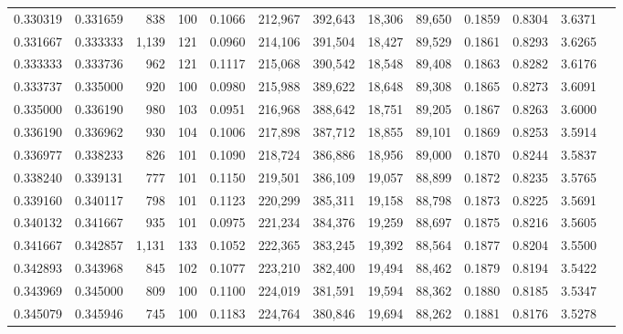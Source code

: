 \begin{tabular}{rrrrrrrrrrrrr}
0.330319 & 0.331659 &    838 &   100 &                                     0.1066 & 212,967 & 392,643 &  18,306 &  89,650 & 0.1859 & 0.8304 & 3.6371 \\
0.331667 & 0.333333 &  1,139 &   121 &                                     0.0960 & 214,106 & 391,504 &  18,427 &  89,529 & 0.1861 & 0.8293 & 3.6265 \\
0.333333 & 0.333736 &    962 &   121 &                                     0.1117 & 215,068 & 390,542 &  18,548 &  89,408 & 0.1863 & 0.8282 & 3.6176 \\
0.333737 & 0.335000 &    920 &   100 &                                     0.0980 & 215,988 & 389,622 &  18,648 &  89,308 & 0.1865 & 0.8273 & 3.6091 \\
0.335000 & 0.336190 &    980 &   103 &                                     0.0951 & 216,968 & 388,642 &  18,751 &  89,205 & 0.1867 & 0.8263 & 3.6000 \\
0.336190 & 0.336962 &    930 &   104 &                                     0.1006 & 217,898 & 387,712 &  18,855 &  89,101 & 0.1869 & 0.8253 & 3.5914 \\
0.336977 & 0.338233 &    826 &   101 &                                     0.1090 & 218,724 & 386,886 &  18,956 &  89,000 & 0.1870 & 0.8244 & 3.5837 \\
0.338240 & 0.339131 &    777 &   101 &                                     0.1150 & 219,501 & 386,109 &  19,057 &  88,899 & 0.1872 & 0.8235 & 3.5765 \\
0.339160 & 0.340117 &    798 &   101 &                                     0.1123 & 220,299 & 385,311 &  19,158 &  88,798 & 0.1873 & 0.8225 & 3.5691 \\
0.340132 & 0.341667 &    935 &   101 &                                     0.0975 & 221,234 & 384,376 &  19,259 &  88,697 & 0.1875 & 0.8216 & 3.5605 \\
0.341667 & 0.342857 &  1,131 &   133 &                                     0.1052 & 222,365 & 383,245 &  19,392 &  88,564 & 0.1877 & 0.8204 & 3.5500 \\
0.342893 & 0.343968 &    845 &   102 &                                     0.1077 & 223,210 & 382,400 &  19,494 &  88,462 & 0.1879 & 0.8194 & 3.5422 \\
0.343969 & 0.345000 &    809 &   100 &                                     0.1100 & 224,019 & 381,591 &  19,594 &  88,362 & 0.1880 & 0.8185 & 3.5347 \\
0.345079 & 0.345946 &    745 &   100 &                                     0.1183 & 224,764 & 380,846 &  19,694 &  88,262 & 0.1881 & 0.8176 & 3.5278 \\

\end{tabular}
